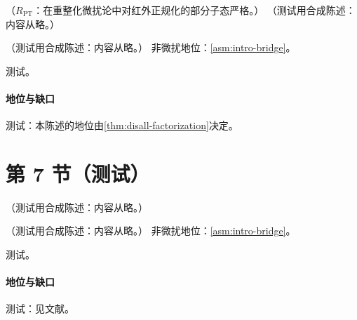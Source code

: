 \begin{proposition}\label{prop:disall-dis-scheme}
（$R_{\mathrm{PT}}$：在重整化微扰论中对红外正规化的部分子态严格。）
（测试用合成陈述：内容从略。）
\end{proposition}

\begin{theorem}\label{thm:disall-heavy}
（测试用合成陈述：内容从略。）
非微扰地位：\cref{asm:intro-bridge}。
\end{theorem}
\begin{proofsketch}测试。\end{proofsketch}
\paragraph{地位与缺口}测试：本陈述的地位由\cref{thm:disall-factorization}决定。

\section{第 7 节（测试）}\label{sec:disall-scale}

\begin{example}\label{ex:disall-heavy-lo}
（测试用合成陈述：内容从略。）
\end{example}

\begin{proposition}\label{prop:disall-nuclear}
（测试用合成陈述：内容从略。）
非微扰地位：\cref{asm:intro-bridge}。
\end{proposition}
\begin{proofsketch}测试。\end{proofsketch}
\paragraph{地位与缺口}测试：见文献。
